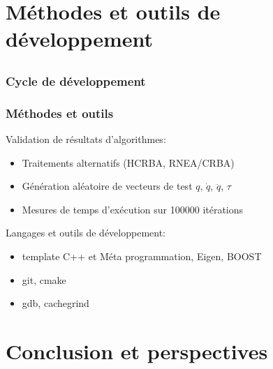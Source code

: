 \documentclass[10pt]{beamer}
\begin{document}
\section{Méthodes et outils de développement}

\subsection{}

\begin{frame}
  \frametitle{Cycle de développement}
  
  
\end{frame}

\begin{frame}
  \frametitle{Méthodes et outils}
  
  Validation de résultats d'algorithmes:
  \begin{itemize}
		\item Traitements alternatifs (HCRBA, RNEA/CRBA)
		\item Génération aléatoire de vecteurs de test $q$, $\dot{q}$, $\ddot{q}$, $\tau$
		\item Mesures de temps d'exécution sur 100000 itérations
  \end{itemize}
  
  \bigskip
  Langages et outils de développement:
  \begin{itemize}
  \item template C++ et Méta programmation, Eigen, BOOST
  \item git, cmake
  \item gdb, cachegrind
  \end{itemize}

\end{frame}


\section{Conclusion et perspectives}

\subsection{}
\end{document}
